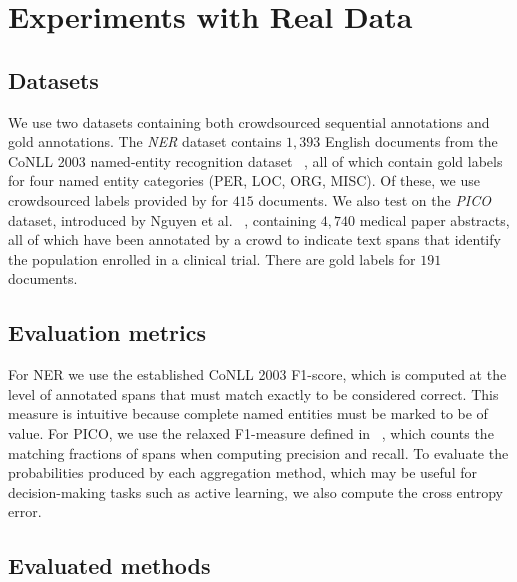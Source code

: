 \section{Experiments with Real Data}\label{sec:expts}
 
\subsection{Datasets}

We use two datasets containing both crowdsourced sequential annotations and gold annotations. 
The \emph{NER} dataset contains $1,393$ English documents from the CoNLL 2003 named-entity recognition dataset
~\cite{tjong2003introduction}, all of which contain gold labels for four named entity categories (PER, LOC, ORG, MISC). Of these, we use crowdsourced labels provided by \cite{rodrigues2014sequence} for $415$ documents.
We also test on the \emph{PICO} dataset, introduced by Nguyen et al. ~\cite{nguyen2017aggregating},
containing $4,740$ medical paper abstracts, all of which have been 
annotated by a crowd to indicate text spans that identify the population enrolled in a clinical trial. There are gold labels for $191$ documents.

\subsection{Evaluation metrics}

For NER we use the established CoNLL 2003 F1-score, which is computed at the level of annotated spans that must match exactly to be considered correct. This measure is intuitive because complete named entities must be marked to be of value. For PICO, we use the relaxed F1-measure defined in ~\cite{nguyen2017aggregating}, which counts the matching fractions of spans when computing precision and recall. 
To evaluate the probabilities produced by each aggregation method, which may be useful for decision-making tasks such as active learning, we also compute the cross entropy error.

\subsection{Evaluated methods}

